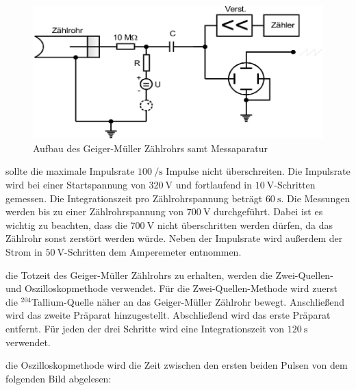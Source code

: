     \begin{figure}[H]
        \centering
        \includegraphics[width=\linewidth]{images/Aufbau.jpg}
        \caption{Aufbau des Geiger-Müller Zählrohrs samt Messaparatur \cite{703}}
        \label{fig:4}
    \end{figure}

    \justifying sollte die maximale Impulsrate $\SI{100}{\per\second}$ Impulse nicht überschreiten. Die Impulsrate wird
    bei einer Startspannung von $\SI{320}{\volt}$ und fortlaufend in $\SI{10}{\volt}$-Schritten gemessen. Die Integrationszeit pro 
    Zählrohrspannung beträgt $\SI{60}{\second}$. Die Messungen werden bis zu einer Zählrohrspannung von $\SI{700}{\volt}$ durchgeführt. Dabei
    ist es wichtig zu beachten, dass die $\SI{700}{\volt}$ nicht überschritten werden dürfen, da das Zählrohr sonst zerstört werden würde.
    Neben der Impulsrate wird außerdem der Strom in $\SI{50}{\volt}$-Schritten dem Amperemeter entnommen.

    \justifying die Totzeit des Geiger-Müller Zählrohrs zu erhalten, werden die Zwei-Quellen- und Oszilloskopmethode verwendet. 
    Für die Zwei-Quellen-Methode wird zuerst die $^{204}$Tallium-Quelle näher an das Geiger-Müller Zählrohr bewegt. Anschließend wird das zweite 
    Präparat hinzugestellt. Abschließend wird das erste Präparat entfernt. Für jeden der drei Schritte wird eine Integrationszeit von $\SI{120}
    {\second}$ verwendet. 

    \justifying die Oszilloskopmethode wird die Zeit zwischen den ersten beiden Pulsen von dem folgenden Bild abgelesen:

